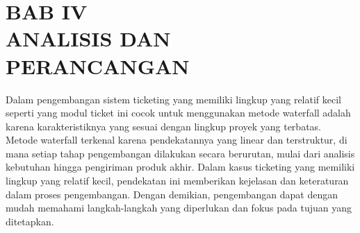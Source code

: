 \documentclass[12pt]{article}
\begin{document}


\newpage
\section[BAB IV ANALISIS DAN PERANCANGAN]{BAB IV\\ANALISIS DAN PERANCANGAN}
\setcounter{table}{0}
\setcounter{figure}{0}

Dalam pengembangan sistem ticketing yang memiliki lingkup yang relatif kecil seperti yang modul ticket ini cocok untuk menggunakan metode waterfall adalah karena karakteristiknya yang sesuai dengan lingkup proyek yang terbatas. Metode waterfall terkenal karena pendekatannya yang linear dan terstruktur, di mana setiap tahap pengembangan dilakukan secara berurutan, mulai dari analisis kebutuhan hingga pengiriman produk akhir. Dalam kasus ticketing yang memiliki lingkup yang relatif kecil, pendekatan ini memberikan kejelasan dan keteraturan dalam proses pengembangan. Dengan demikian, pengembangan dapat dengan mudah memahami langkah-langkah yang diperlukan dan fokus pada tujuan yang ditetapkan.
\end{document}
